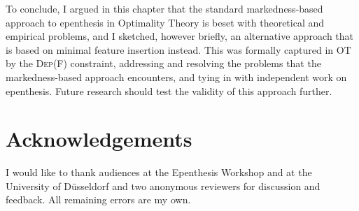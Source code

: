\documentclass[output=paper,colorlinks,citecolor=brown]{langscibook}
\begin{document}
To conclude, I argued in this chapter that the standard markedness-based approach to epenthesis in Optimality Theory is beset with theoretical and empirical problems, and I sketched, however briefly, an alternative approach that is based on minimal feature insertion instead. This was formally captured in OT by the \textsc{Dep(F)} constraint, addressing and resolving the problems that the markedness-based approach encounters, and tying in with independent work on epenthesis. Future research should test the validity of this approach further.

\section*{Acknowledgements}

I would like to thank audiences at the Epenthesis Workshop and at the University of Düsseldorf and two anonymous reviewers for discussion and feedback. All remaining errors are my own.

\printbibliography[heading=subbibliography,notkeyword=this]
\end{document}
